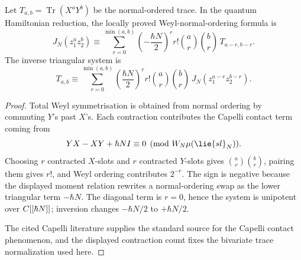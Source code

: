 \begin{lem}
\label{lem:app-radial-capelli-triangular}
  Let \(T_{a,b}=\operatorname{Tr}(X^aY^b)\) be the normal-ordered trace.
  In the quantum Hamiltonian reduction, the locally proved
  Weyl-normal-ordering formula is
  \[
    J_N(z_1^az_2^b)\equiv
      \sum_{r=0}^{\min(a,b)}
        \left(-\frac{\hbar N}{2}\right)^r
        r!\binom ar\binom br\,T_{a-r,b-r}.
  \]
  The inverse triangular system is
  \[
    T_{a,b}\equiv
      \sum_{r=0}^{\min(a,b)}
        \left(\frac{\hbar N}{2}\right)^r
        r!\binom ar\binom br\,J_N(z_1^{a-r}z_2^{b-r}).
  \]
\end{lem}

\begin{proof}
  Total Weyl symmetrisation is obtained from normal ordering by
  commuting \(Y\)'s past \(X\)'s.  Each contraction contributes the
  Capelli contact term coming from
  \[
    YX-XY+\hbar N I\equiv0
      \pmod{\mathcal W_N\widehat\mu(\lie{sl}_N)}.
  \]
  Choosing \(r\) contracted \(X\)-slots and \(r\) contracted \(Y\)-slots
  gives \(\binom ar\binom br\), pairing them gives \(r!\), and Weyl
  ordering contributes \(2^{-r}\).  The sign is negative because the
  displayed moment relation rewrites a normal-ordering swap as the
  lower triangular term \(-\hbar N\).  The diagonal term is \(r=0\),
  hence the system is unipotent over \(C[[\hbar N]]\); inversion
  changes \(-\hbar N/2\) to \(+\hbar N/2\).

  The cited Capelli literature supplies the standard source for the
  Capelli contact phenomenon, and the displayed contraction count fixes
  the bivariate trace normalization used here.
\end{proof}

